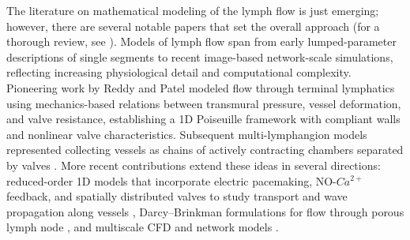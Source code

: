 \documentclass[12pt,a4paper]{article}
\begin{document}
The literature on mathematical modeling of the lymph flow is just emerging; however, there are several notable papers that set the overall approach (for a thorough review, see \cite{jayathungage2024computational,margaris2012modelling}). Models of lymph flow span from early lumped-parameter descriptions of single segments to recent image-based network-scale simulations, reflecting increasing physiological detail and computational complexity. Pioneering work by Reddy and Patel \cite{reddy1995mathematical} modeled flow through terminal lymphatics using mechanics-based relations between transmural pressure, vessel deformation, and valve resistance, establishing a 1D Poiseuille framework with compliant walls and nonlinear valve characteristics. Subsequent multi-lymphangion models represented collecting vessels as chains of actively contracting chambers separated by valves \cite{bertram2014development}. More recent contributions extend these ideas in several directions: reduced-order 1D models that incorporate electric pacemaking, NO-$Ca^{2+}$ feedback, and spatially distributed valves to study transport and wave propagation along vessels \cite{sedaghati20231d,kunert2015mechanobiological,contarino2018one,li2024fluid}, Darcy–Brinkman formulations for flow through porous lymph node \cite{giantesio2021model}, and multiscale CFD and network models \cite{girelli2024multiscale}.
\end{document}
